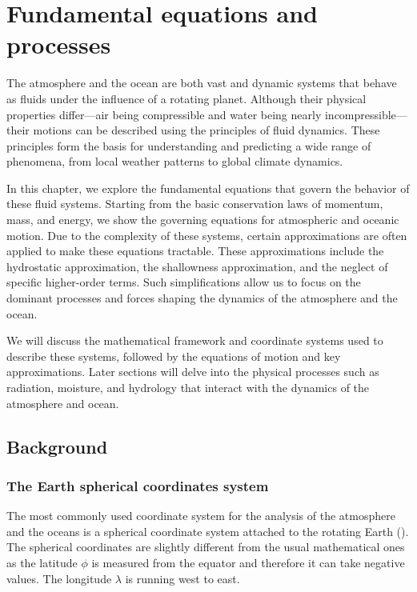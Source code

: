 
\chapter{Fundamental equations and processes}
\label{ch:fundamental-eqs-processes}




The atmosphere and the ocean are both vast and dynamic systems that behave as fluids under the influence of a rotating planet. Although their physical properties differ—air being compressible and water being nearly incompressible—their motions can be described using the principles of fluid dynamics. These principles form the basis for understanding and predicting a wide range of phenomena, from local weather patterns to global climate dynamics.

In this chapter, we explore the fundamental equations that govern the behavior of these fluid systems. Starting from the basic conservation laws of momentum, mass, and energy, we show the governing equations for atmospheric and oceanic motion. Due to the complexity of these systems, certain approximations are often applied to make these equations tractable. These approximations include the hydrostatic approximation, the shallowness approximation, and the neglect of specific higher-order terms. Such simplifications allow us to focus on the dominant processes and forces shaping the dynamics of the atmosphere and the ocean.

We will discuss the mathematical framework and coordinate systems used to describe these systems, followed by the equations of motion and key approximations. Later sections will delve into the physical processes such as radiation, moisture, and hydrology that interact with the dynamics of the atmosphere and ocean.

\section{Background}\label{sec:intro-fund-eqs-processes}

\subsection{The Earth spherical coordinates system}
\label{subsec:spherical-coordinate-systems}
The most commonly used coordinate system for the analysis of the
atmosphere and the oceans is a spherical coordinate system attached to
the rotating Earth (\fig{\ref{fig:3d-coordinate-sys}}). The spherical coordinates are
slightly different from the usual mathematical ones as the latitude $\phi$ is
measured from the equator and therefore it can take negative values.
The longitude $\lambda$ is running west to east.

